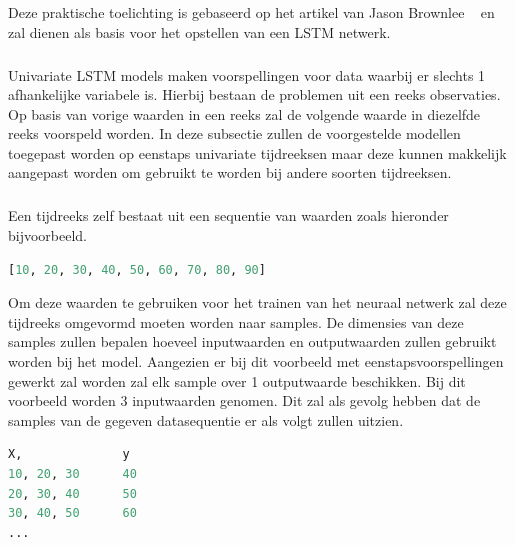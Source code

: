 \subsection{}
\label{subsec: Praktische toelichting van long short term memory netwerken (LSTM)}

Deze praktische toelichting is gebaseerd op het artikel van Jason Brownlee ~\autocite{Brownlee2018b} en zal dienen als basis voor het opstellen van een LSTM netwerk.

\subsubsection{}

Univariate LSTM models maken voorspellingen voor data waarbij er slechts 1 afhankelijke variabele is.
Hierbij bestaan de problemen uit een reeks observaties. Op basis van vorige waarden in een reeks zal de volgende waarde in diezelfde reeks voorspeld worden. In deze subsectie zullen de voorgestelde modellen toegepast worden op eenstaps univariate tijdreeksen maar deze kunnen makkelijk aangepast worden om gebruikt te worden bij andere soorten tijdreeksen.

\subparagraph{}
Een tijdreeks zelf bestaat uit een sequentie van waarden zoals hieronder bijvoorbeeld.
\begin{lstlisting}[language=Python]
[10, 20, 30, 40, 50, 60, 70, 80, 90]
\end{lstlisting}

Om deze waarden te gebruiken voor het trainen van het neuraal netwerk zal deze tijdreeks omgevormd moeten worden naar samples. De dimensies van deze samples zullen bepalen hoeveel inputwaarden en outputwaarden zullen gebruikt worden bij het model. Aangezien er bij dit voorbeeld met eenstapsvoorspellingen gewerkt zal worden zal elk sample over 1 outputwaarde beschikken. Bij dit voorbeeld worden 3 inputwaarden genomen. Dit zal als gevolg hebben dat de samples van de gegeven datasequentie er als volgt zullen uitzien.

\begin{lstlisting}[language=Python]
X,		        y
10, 20, 30		40
20, 30, 40		50
30, 40, 50		60
...
\end{lstlisting}

